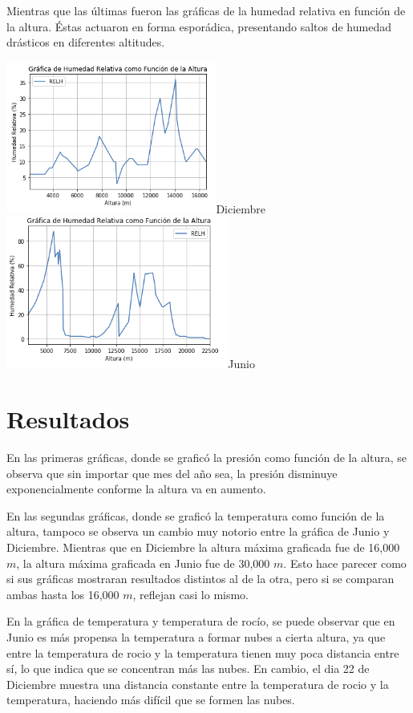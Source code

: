 \documentclass{article}
\begin{document}
    Mientras que las últimas fueron las gráficas de la humedad relativa en función de la altura. Éstas actuaron en forma esporádica, presentando saltos de humedad drásticos en diferentes altitudes.
    
    \begin{center}
    \includegraphics[height=5cm]{HumRelDec.png}{Diciembre}
    \includegraphics[height=5cm]{HumRelJun.png}{Junio}
    \end{center}
    
\section{Resultados}
En las primeras gráficas, donde se graficó la presión como función de la altura, se observa que sin importar que mes del año sea, la presión disminuye exponencialmente conforme la altura va en aumento. 

	En las segundas gráficas, donde se graficó la temperatura como función de la altura, tampoco se observa un cambio muy notorio entre la gráfica de Junio y Diciembre. Mientras que en Diciembre la altura máxima graficada fue de 16,000 $m$, la altura máxima graficada en Junio fue de 30,000 $m$. Esto hace parecer como si sus gráficas mostraran resultados distintos al de la otra, pero si se comparan ambas hasta los 16,000 $m$, reflejan casi lo mismo.
	
    En la gráfica de temperatura y temperatura de rocío, se puede observar que en Junio es más propensa la temperatura a formar nubes a cierta altura, ya que entre la temperatura de rocio y la temperatura tienen muy poca distancia entre sí, lo que indica que se concentran más las nubes. En cambio, el dia 22 de Diciembre muestra una distancia constante entre la temperatura de rocio y la temperatura, haciendo más difícil que se formen las nubes.
    
\end{document}
